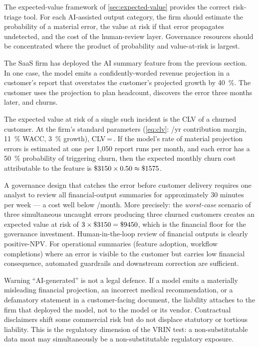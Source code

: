 The expected-value framework of \cref{sec:expected-value} provides the correct risk-triage tool.
For each AI-assisted output category, the firm should estimate the probability of a material error,
the value at risk if that error propagates undetected, and the cost of the human-review layer.
Governance resources should be concentrated where the product of probability and value-at-risk
is largest.

\begin{example}
The SaaS firm has deployed the AI summary feature from the previous section. In one case, the
model emits a confidently-worded revenue projection in a customer's report that overstates
the customer's projected growth by \qty{40}{\percent}. The customer uses the projection to
plan headcount, discovers the error three months later, and churns.

The expected value at risk of a single such incident is the CLV of a churned customer. At the
firm's standard parameters (\cref{eq:clv}: /yr contribution margin, \qty{11}{\percent}
WACC, \qty{3}{\percent} growth), CLV\,=\,. If the model's rate of material
projection errors is estimated at one per 1{,}050 report runs per month, and each error
has a \qty{50}{\percent} probability of triggering churn, then the expected monthly churn
cost attributable to the feature is \(\$\num{3150}\times 0.50\approx\$\num{1575}\).

A governance design that catches the error before customer delivery requires one analyst to
review all financial-output summaries for approximately 30 minutes per week — a cost well
below /month. More precisely: the \emph{worst-case} scenario of three simultaneous
uncaught errors producing three churned customers creates an expected value at risk of
\(3\times\$\num{3150}=\$\num{9450}\), which is the financial floor for the governance
investment. Human-in-the-loop review of financial outputs is clearly positive-NPV. For
operational summaries (feature adoption, workflow completions) where an error is visible to
the customer but carries low financial consequence, automated guardrails and downstream
correction are sufficient.
\end{example}

\begin{admonition}{Warning}
``AI-generated'' is not a legal defence. If a model emits a materially misleading financial
projection, an incorrect medical recommendation, or a defamatory statement in a customer-facing
document, the liability attaches to the firm that deployed the model, not to the model or its
vendor. Contractual disclaimers shift some commercial risk but do not displace statutory or
tortious liability. This is the regulatory dimension of the VRIN test: a non-substitutable data
moat may simultaneously be a non-substitutable regulatory exposure.
\end{admonition}


